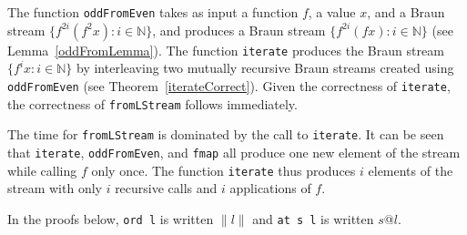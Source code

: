 \documentclass[envcountsect]{llncs}
\newcommand{\ord}[1]{\|#1\|}
\begin{document}
The function {\tt oddFromEven} takes as input a function $f$, a value $x$, and a Braun stream $\{ f^{2i} (f^2 x): i \in \mathbb{N}\}$, and produces a Braun stream $\{ f^{2i} (f x): i \in \mathbb{N}\}$ (see Lemma~\ref{oddFromLemma}).
The function {\tt iterate} produces the Braun stream $\{ f^i x: i \in \mathbb{N}\}$ by interleaving two mutually recursive Braun streams created using {\tt oddFromEven} (see Theorem~\ref{iterateCorrect}).
Given the correctness of {\tt iterate}, the correctness of {\tt fromLStream} follows immediately.

The time for {\tt fromLStream} is dominated by the call to {\tt iterate}.
It can be seen that {\tt iterate}, {\tt oddFromEven}, and {\tt fmap} all produce one new element of the stream while calling $f$ only once.
The function {\tt iterate} thus produces $i$ elements of the stream with only $i$ recursive calls and $i$ applications of $f$.

In the proofs below, \verb|ord l| is written $\ord{l}$ and \verb|at s l| is written $s@l$.
\end{document}
